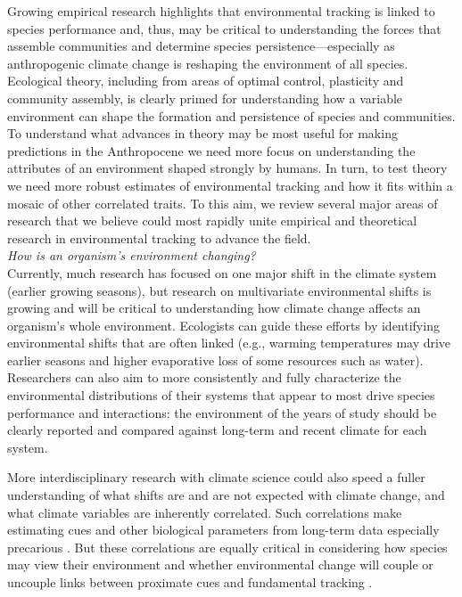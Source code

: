 \documentclass[11pt,letterpaper]{article}
\begin{document}
Growing empirical research highlights that environmental tracking is linked to species performance and, thus, may be critical to understanding the forces that assemble communities and determine species persistence---especially as anthropogenic climate change is reshaping the environment of all species. Ecological theory, including from areas of optimal control, plasticity and community assembly, is clearly primed for understanding how a variable environment can shape the formation and persistence of species and communities. To understand what advances in theory may be most useful for making predictions in the Anthropocene we need more focus on understanding the attributes of an environment shaped strongly by humans. In turn, to test theory we need more robust estimates of environmental tracking and how it fits within a mosaic of other correlated traits. To this aim, we review several major areas of research that we believe could most rapidly unite empirical and theoretical research in environmental tracking to advance the field.\\ %

\emph{How is an organism's environment changing?} \\ 
Currently, much research has focused on one major shift in the climate system (earlier growing seasons), but research on multivariate environmental shifts is growing and will be critical to understanding how climate change affects an organism's whole environment. Ecologists can guide these efforts by identifying environmental shifts that are often linked (e.g., warming temperatures may drive earlier seasons and higher evaporative loss of some resources such as water). Researchers can also aim to more consistently and fully characterize the environmental distributions of their systems that appear to most drive species performance and interactions: the environment of the years of study should be clearly reported and compared against long-term and recent climate for each system. 

More interdisciplinary research with climate science could also speed a fuller understanding of what shifts are and are not expected with climate change, and what climate variables are inherently correlated. Such correlations make estimating cues and other biological parameters from long-term data especially precarious \citep{tansey2017}. But these correlations are equally critical in considering how species may view their environment and whether environmental change will couple or uncouple links between proximate cues and fundamental tracking \citep{bonamour2019}. \\
\end{document}
